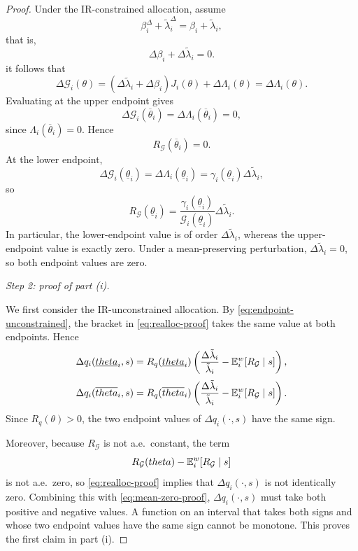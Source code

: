 \documentclass[master.tex]{subfiles}
\begin{document}
\begin{proof}
Under the IR-constrained allocation, assume
\[
\beta_i^\Delta+\tilde\lambda_i^\Delta=\beta_i+\tilde\lambda_i,
\]
that is,
\[
\Delta\beta_i+\Delta\tilde\lambda_i=0.
\]
it follows that
\[
\Delta\mathcal G_i(\theta)
=
(\Delta\tilde\lambda_i+\Delta\beta_i)J_i(\theta)+\Delta\Lambda_i(\theta)
=
\Delta\Lambda_i(\theta).
\]
Evaluating at the upper endpoint gives
\[
\Delta\mathcal G_i(\overline\theta_i)
=
\Delta\Lambda_i(\overline\theta_i)
=
0,
\]
since $\Lambda_i(\overline\theta_i)=0$. Hence
\begin{equation}\label{eq:upper-constrained}
R_{\mathcal G}(\overline\theta_i)=0.
\end{equation}
At the lower endpoint,
\[
\Delta\mathcal G_i(\underline\theta_i)
=
\Delta\Lambda_i(\underline\theta_i)
=
\gamma_i(\underline\theta_i)\Delta\tilde\lambda_i,
\]
so
\begin{equation}\label{eq:lower-constrained}
R_{\mathcal G}(\underline\theta_i)
=
\frac{\gamma_i(\underline\theta_i)}{\mathcal G_i(\underline\theta_i)}\Delta\tilde\lambda_i.
\end{equation}
In particular, the lower-endpoint value is of order $\Delta\tilde\lambda_i$, whereas the upper-endpoint value is exactly zero. Under a mean-preserving perturbation, $\Delta\tilde\lambda_i=0$, so both endpoint values are zero.


\noindent\textit{Step 2: proof of part (i).}

We first consider the IR-unconstrained allocation. By \eqref{eq:endpoint-unconstrained}, the bracket in \eqref{eq:realloc-proof} takes the same value at both endpoints. Hence
\[
\Delta q_i(\underline{theta}_i,s)
=
R_q(\underline{theta}_i)
\left(
\frac{\Delta\tilde\lambda_i}{\tilde\lambda_i}
-
\mathbb{E}_i^w[R_{\mathcal G}\mid s]
\right),
\]
\[
\Delta q_i(\overline{theta}_i,s)
=
R_q(\overline{theta}_i)
\left(
\frac{\Delta\tilde\lambda_i}{\tilde\lambda_i}
-
\mathbb{E}_i^w[R_{\mathcal G}\mid s]
\right).
\]
Since $R_q(\theta)>0$, the two endpoint values of $\Delta q_i(\cdot,s)$ have the same sign.

Moreover, because $R_{\mathcal G}$ is not a.e.\ constant, the term
\[
R_{\mathcal G}(theta)-\mathbb{E}_i^w[R_{\mathcal G}\mid s]
\]
is not a.e.\ zero, so \eqref{eq:realloc-proof} implies that $\Delta q_i(\cdot,s)$ is not identically zero. Combining this with \eqref{eq:mean-zero-proof}, $\Delta q_i(\cdot,s)$ must take both positive and negative values. A function on an interval that takes both signs and whose two endpoint values have the same sign cannot be monotone. This proves the first claim in part (i).


\end{proof}
\end{document}
